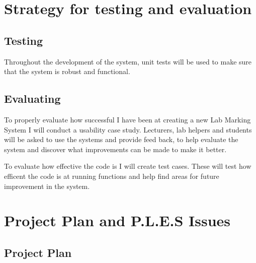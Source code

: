 \documentclass[12pt]{article}  %
\theoremstyle{definition}
\theoremstyle{remark}
\begin{document}

\newpage
\section{Strategy for testing and evaluation}

\subsection{Testing}
Throughout the development of the system, unit tests will be used to make sure that the system is robust and functional. \\

\subsection{Evaluating}
To properly evaluate how successful I have been at creating a new Lab Marking System I will conduct a usability case study. Lecturers, lab helpers and students will be asked to use the systems and provide feed back, to help evaluate the system and discover what improvements can be made to make it better.

To evaluate how effective the code is I will create test cases. These will test how efficent the code is at running functions and help find areas for future improvement in the system.









\newpage
\section{Project Plan and P.L.E.S Issues}

\subsection{Project Plan}
\end{document}
